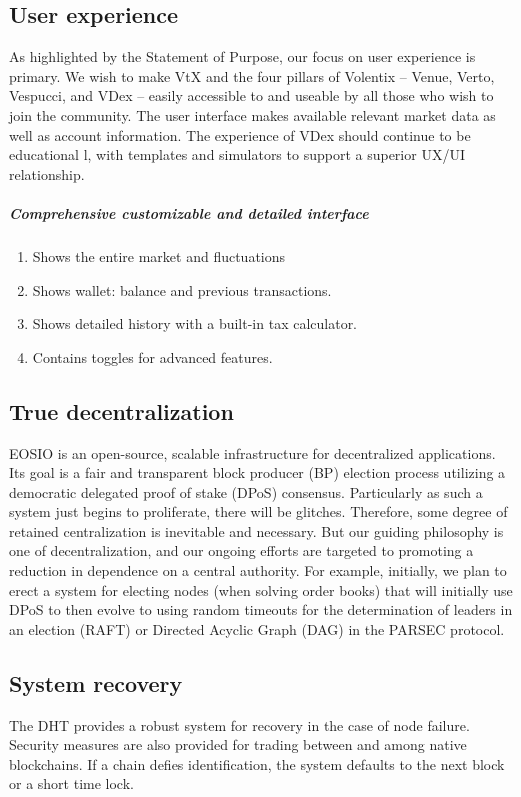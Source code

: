 \documentclass[]{article}
\begin{document}
{\subsection{User experience}
As highlighted by the Statement of Purpose, our focus on user experience is primary. We wish to make VtX and the four pillars of Volentix -- Venue, Verto, Vespucci, and VDex -- easily accessible to and useable by all those who wish to join the community. The user interface makes available relevant market data as well as account information. The experience of VDex should continue to be educational l, with templates and simulators to support a superior UX/UI relationship. 
\subparagraph{Comprehensive customizable and detailed interface}
\begin{enumerate}
	\item Shows the entire market and fluctuations
	\item Shows wallet: balance and previous transactions.
	\item Shows detailed history with a built-in tax calculator.
	\item Contains toggles for advanced features.         
\end{enumerate}

\subsection{True decentralization}

EOSIO is an open-source, scalable infrastructure for decentralized applications. Its goal is a fair and transparent block producer (BP) election process utilizing a democratic delegated proof of stake (DPoS) consensus. Particularly as such a system just begins to proliferate, there will be glitches.  Therefore, some degree of retained centralization is inevitable and necessary. But our guiding philosophy is one of decentralization, and our ongoing efforts are targeted to promoting a reduction in dependence on a central authority. 
For example, initially, we plan to erect a system for electing nodes (when solving order books) that will initially use DPoS to then evolve to using random timeouts for the determination of leaders in an election (RAFT) or Directed Acyclic Graph (DAG) in the PARSEC protocol.


\subsection{System recovery}
The DHT provides a robust system for recovery in the case of node failure. Security measures are also provided for trading between and among native blockchains. If a chain defies identification, the system defaults to the next block or a short time lock. 


}
\end{document}
